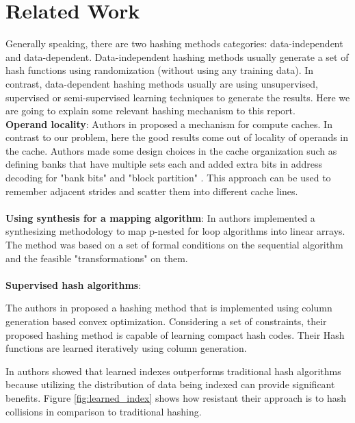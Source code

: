 \section{Related Work}
\label{related_work}
Generally speaking, there are two hashing methods categories: data-independent and data-dependent. Data-independent hashing methods usually generate a set of hash functions using randomization (without using any training data). In contrast,  data-dependent hashing methods usually are using unsupervised, supervised or semi-supervised learning techniques to generate the results. Here we are going to explain some relevant hashing mechanism to this report. 
\\
\textbf{Operand locality}: Authors in \cite{compute-caches} proposed a mechanism for compute caches. In contrast to our problem, here the good results come out of locality of operands in the cache. Authors made some design choices in the cache organization such as defining banks that
have multiple sets each and added extra bits in address decoding for "bank bits" and "block partition" \cite{compute-caches}. This approach can be used to remember adjacent strides and scatter them into different cache lines.
\\
~
\\
\textbf{Using synthesis for a mapping algorithm}: In \cite{synthesis-map} authors implemented a synthesizing methodology to map p-nested for loop algorithms into linear arrays. The method was based on a set of formal conditions on the sequential algorithm and the feasible "transformations" on them. 
\\
~
\\
\textbf{Supervised hash algorithms}:

The authors in \cite{learning-hash} proposed a hashing method that is implemented using column generation based convex optimization. Considering a set of constraints, their proposed hashing method is capable of learning compact hash codes. Their Hash functions are learned iteratively using column generation.

In \cite{learning-index} authors showed that learned indexes outperforms traditional hash algorithms because utilizing the distribution of data being indexed can provide significant benefits. Figure \ref{fig:learned_index} shows how resistant their approach is to hash collisions in comparison to traditional hashing. 

